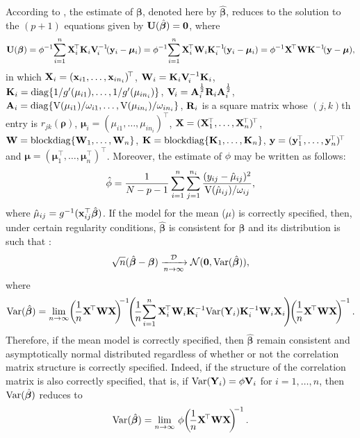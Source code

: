 \noindent According to \cite{LZ86}, the estimate of $\bm{\beta}$, denoted here by $\hat{\bm{\beta}}$, reduces to the solution to the $(p+1)$ equations given by ${\bf U}(\hat{\bm{\beta}})={\bf 0}$, where
\begin{equation}\label{gee}
{\bf U}(\bm{\beta})=\phi^{-1}\!\sum\limits_{i=1}^n{\bf X}_i^{\!\top}{\bf K}_i{\bf V}_{\!i}^{-1}\!({\bf y}_i-\bm{\mu}_i)=\phi^{-1}\!\sum\limits_{i=1}^n{\bf X}_i^{\!\top}{\bf W}_i{\bf K}_i^{-1}\!({\bf y}_i-\bm{\mu}_i)=\phi^{-1}{\bf X}^{\!\top}{\bf W}{\bf K}^{-1}\!({\bf y}-\bm{\mu}),
\end{equation}
in which ${\bf X}_i=({\bf x}_{i1},\ldots,{\bf x}_{in_i})^{\!\top}$, ${\bf W}_i={\bf K}_i{\bf V}_{\!i}^{-1}{\bf K}_i$, ${\bf K}_i={\rm diag}\{1/g'(\mu_{i1}),\ldots,1/g'(\mu_{in_i})\}$, ${\bf V}_{\!i}={\bf A}_{i}^{\frac{1}{2}}{\bf R}_i {\bf A}_{i}^{\frac{1}{2}}$, 
${\bf A}_i={\rm diag}\{{\rm V}(\mu_{i1})/\omega_{i1},\ldots,{\rm V}(\mu_{in_i})/\omega_{in_i}\}$, ${\bf R}_i$ is a square matrix
whose $(j,k)$th entry is $r_{jk}(\bm{\rho})$, $\bm{\mu}_i=(\mu_{i1},\ldots,\mu_{in_i})^{\!\top}$, ${\bf X}=({\bf X}^{\!\top}_1,\ldots,{\bf X}^{\!\top}_n)^{\!\top}$, ${\bf W}={\rm blockdiag}\{{\bf W}_1,\ldots,{\bf W}_n\}$, ${\bf K}={\rm blockdiag}\{{\bf K}_1,\ldots,{\bf K}_n\}$, ${\bf y}=({\bf y}^{\!\top}_1,\ldots,{\bf y}^{\!\top}_n)^{\!\top}$ and $\bm{\mu}=(\bm{\mu}^{\!\top}_1,\ldots,\bm{\mu}^{\!\top}_n)^{\!\top}$. Moreover, the estimate of
$\phi$ may be written as follows:
$$\hat{\phi}=\dfrac{1}{N-p-1}\sum\limits_{i=1}^n\sum\limits_{j=1}^{n_i}\dfrac{(y_{ij}-\hat{\mu}_{ij})^2}{{\rm V}(\hat{\mu}_{ij})/\omega_{ij}},$$
where $\hat{\mu}_{ij}=g^{-1}({\bf x}_{ij}^{\top}\hat{\bm{\beta}})$. If the model for the mean ($\mu$) is correctly specified, then, under certain regularity conditions, $\hat{\bm{\beta}}$ is consistent for $\bm{\beta}$ and its distribution is such that \citep{LZ86}:
$$\sqrt{n}(\hat{\bm{\beta}}-\bm{\beta}) \xrightarrow[n \to \infty]{\mathcal{D}}\mathcal{N}({\bf 0},{\rm Var}(\hat{\bm{\beta}})),$$
where
$${\rm Var}(\hat{\bm{\beta}})=\lim_{n\to\infty}\!\left(\!\frac{1}{n}{\bf X}^{\!\top}{\bf W}{\bf X}\!\right)^{\!\!-1}\!\!\left(\!\frac{1}{n}\!\sum\limits_{i=1}^n {\bf X}_i^{\!\top}{\bf W}_i{\bf K}_i^{-1} {\rm Var}({\bf Y}_i){\bf K}_i^{-1}{\bf W}_i{\bf X}_i\!\right)\!\!\left(\!\frac{1}{n}{\bf X}^{\!\top}{\bf W}{\bf X}\!\right)^{\!\!-1}.$$
Therefore, if the mean model is correctly specified, then $\hat{\bm{\beta}}$ remain consistent and asymptotically normal distributed 
regardless of whether or not the correlation matrix structure is correctly specified. Indeed, if the structure of the correlation matrix is also correctly specified, that is, if ${\rm Var}({\bf Y}_i)=\phi{\bf V}_i$ for $i=1,\ldots,n$, then ${\rm Var}(\hat{\bm{\beta}})$ reduces to
$${\rm Var}(\hat{\bm{\beta}})=\lim_{n\to\infty}\,\phi\!\left(\!\frac{1}{n}{\bf X}^{\!\top}{\bf W}{\bf X}\!\right)^{\!\!-1}.$$

